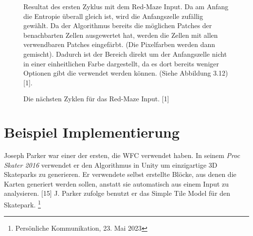 \documentclass[12pt, a4paper,twoside,openright]{report}
\begin{document}
\begin{figure}[H]
    \centering
    \caption{
        Resultat des ersten Zyklus mit dem Red-Maze Input. Da am Anfang die Entropie überall gleich ist, wird die Anfangszelle zufällig gewählt.
        Da der Algorithmus bereits die möglichen Patches der benachbarten Zellen ausgewertet hat, werden die Zellen mit allen verwendbaren Patches eingefärbt.
        {(Die Pixelfarben werden dann gemischt)}.
        Dadurch ist der Bereich direkt um der Anfangszelle nicht in einer einheitlichen Farbe dargestellt, da es dort bereits weniger Optionen gibt die verwendet werden können.
        {(Siehe Abbildung 3.12)} {[1]}.
    }%
\end{figure}

\begin{figure}[H]
    \centering
    \caption{Die nächsten Zyklen für das Red-Maze Input. {[1]}}%
\end{figure}

\section{Beispiel Implementierung}

Joseph Parker war einer der ersten, die WFC verwendet haben.
In seinem \textit{Proc Skater 2016} verwendet er den Algorithmus in Unity um einzigartige 3D Skateparks zu generieren.
Er verwendete selbst erstellte Blöcke, aus denen die Karten generiert werden sollen, anstatt sie automatisch aus einem Input zu analysieren. [15]
J. Parker zufolge benutzt er das Simple Tile Model für den Skatepark. \footnote[4]{Persönliche Kommunikation, 23. Mai 2023}
\end{document}
